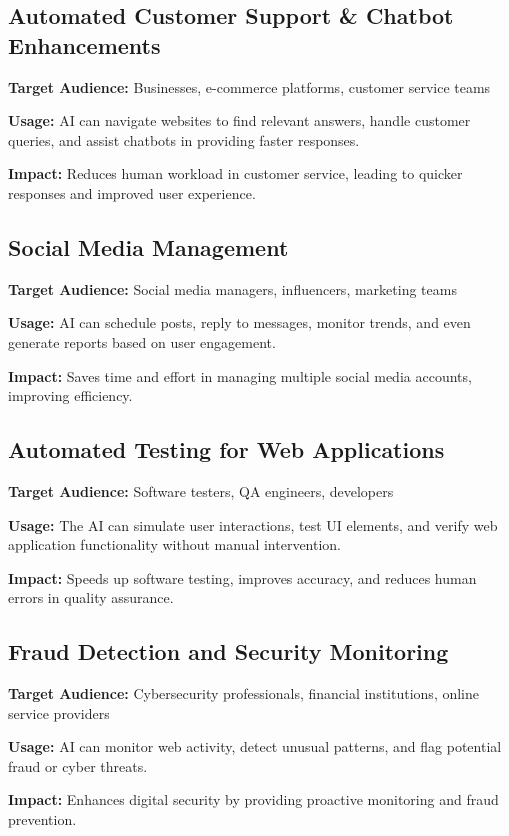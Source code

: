 \documentclass[conference]{IEEEtran}
\begin{document}
\subsection{Automated Customer Support \& Chatbot Enhancements}
\textbf{Target Audience:} Businesses, e-commerce platforms, customer service teams

\textbf{Usage:} AI can navigate websites to find relevant answers, handle customer queries, and assist chatbots in providing faster responses.

\textbf{Impact:} Reduces human workload in customer service, leading to quicker responses and improved user experience.

\subsection{Social Media Management}
\textbf{Target Audience:} Social media managers, influencers, marketing teams

\textbf{Usage:} AI can schedule posts, reply to messages, monitor trends, and even generate reports based on user engagement.

\textbf{Impact:} Saves time and effort in managing multiple social media accounts, improving efficiency.

\subsection{Automated Testing for Web Applications}
\textbf{Target Audience:} Software testers, QA engineers, developers

\textbf{Usage:} The AI can simulate user interactions, test UI elements, and verify web application functionality without manual intervention.

\textbf{Impact:} Speeds up software testing, improves accuracy, and reduces human errors in quality assurance.

\subsection{Fraud Detection and Security Monitoring}
\textbf{Target Audience:} Cybersecurity professionals, financial institutions, online service providers

\textbf{Usage:} AI can monitor web activity, detect unusual patterns, and flag potential fraud or cyber threats.

\textbf{Impact:} Enhances digital security by providing proactive monitoring and fraud prevention.
\end{document}
